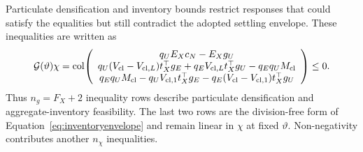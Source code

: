 \documentclass[a4paper,fleqn]{cas-sc}
\newcommand{\col}{\operatorname{col}}
\begin{document}
Particulate densification and inventory bounds restrict responses that could satisfy the equalities but still contradict the adopted settling envelope. These inequalities are written as
\begin{equation}
\mathcal G(\vartheta)\chi=
\col\!\left(
\begin{array}{c}
q_UE_Xc_N-E_Xg_U\\
q_U(V_{\rm cl}-V_{{\rm cl},L})t_X^\top g_E
+q_EV_{{\rm cl},L}t_X^\top g_U-q_Eq_UM_{\rm cl}\\
q_Eq_UM_{\rm cl}-q_UV_{{\rm cl},1}t_X^\top g_E
-q_E(V_{\rm cl}-V_{{\rm cl},1})t_X^\top g_U
\end{array}\right)\le0.
\label{eq:G}
\end{equation}
Thus $n_g=F_X+2$ inequality rows describe particulate densification and aggregate-inventory feasibility. The last two rows are the division-free form of Equation~\eqref{eq:inventoryenvelope} and remain linear in $\chi$ at fixed $\vartheta$. Non-negativity contributes another $n_\chi$ inequalities.
\end{document}
